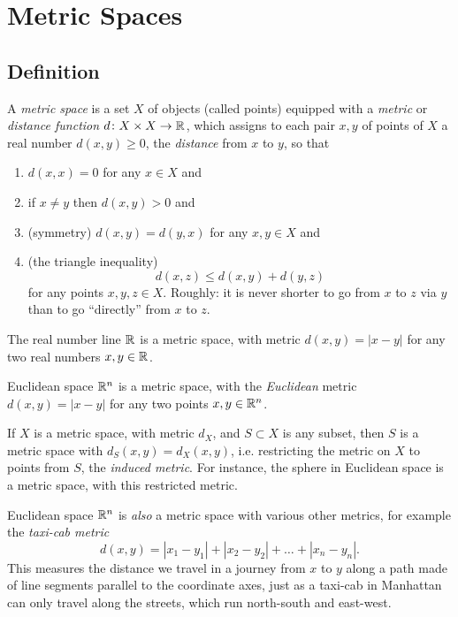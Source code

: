 \chapter{Metric Spaces}\label{chapter:metric.spaces}%

\section{Definition}
A \emph{metric space} is a set \(X\) of objects (called points) equipped with a \emph{metric} or \emph{distance function}  \(d \colon X \times X \to \mathbb{R}^{}\), which assigns to each pair \(x, y\) of points of \(X\) a real number \(d(x, y) \ge 0\), the \emph{distance} from \(x\) to \(y\), so that
\begin{enumerate}
\item \(d(x,x) = 0\) for any \(x \in X\) and
\item if \(x \ne y\) then \(d(x, y) > 0\) and
\item (symmetry) \(d(x,y) = d(y,x)\) for any \(x,y \in X\) and
\item (the triangle inequality) 
\[
d(x,z) \le d(x,y) + d(y,z) 
\]
for any points \(x,y,z \in X\). Roughly: it is never shorter to go from \(x\) to \(z\) via \(y\) than to go ``directly'' from \(x\) to \(z\).
\end{enumerate}
\begin{example}
The real number line \(\mathbb{R}^{}\) is a metric space, with metric \(d(x,y)=|x-y|\) for any two real numbers \(x,y \in \mathbb{R}^{}\).
\end{example}
\begin{example}
Euclidean space \(\mathbb{R}^{n}\) is a metric space, with the \emph{Euclidean} metric \(d(x,y)=\left|x-y\right|\) for any two points \(x,y \in \mathbb{R}^{n}\).
\end{example}
\begin{example}
If \(X\) is a metric space, with metric \(d_X\), and \(S \subset X\) is any subset, then \(S\) is a metric space with \(d_S(x,y)=d_X(x,y)\), i.e. restricting the metric on \(X\) to points from \(S\), the \emph{induced metric}.
For instance, the sphere in Euclidean space is a metric space, with this restricted metric.
\end{example}
\begin{example}
Euclidean space \(\mathbb{R}^{n}\) is \emph{also} a metric space with various other metrics, for example the \emph{taxi-cab metric}
\[
d(x,y)=\left|x_1-y_1\right|+\left|x_2-y_2\right|+\dots+\left|x_n-y_n\right|.
\]
This measures the distance we travel in a journey from \(x\) to \(y\) along a path made of line segments parallel to the coordinate axes, just as a taxi-cab in Manhattan can only travel along the streets, which run north-south and east-west.
\end{example}
